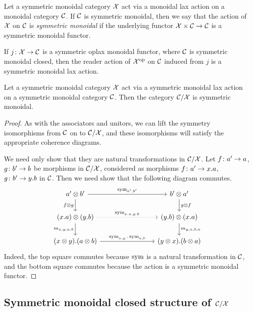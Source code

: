 \documentclass{article}
\begin{document}
\begin{definition}
  Let a symmetric monoidal category $\mathcal X$ act via a monoidal lax action on a monoidal category ${\mathcal{C}}$.  
  If ${\mathcal{C}}$ is symmetric monoidal, then we say that the action of $\mathcal X$ on ${\mathcal{C}}$ is \emph{symmetric monoidal} if the underlying functor $\mathcal X \times {\mathcal{C}} \to {\mathcal{C}}$ is a symmetric monoidal functor.
\end{definition}

\begin{example}
  If $j\colon \mathcal X \to {\mathcal{C}}$ is a symmetric oplax monoidal functor, where ${\mathcal{C}}$ is symmetric monoidal closed, then the reader action of $\mathcal X^{\mathrm{op}}$ on ${\mathcal{C}}$ induced from $j$ is a symmetric monoidal lax action.
\end{example}

\begin{proposition}
  Let a symmetric monoidal category $\mathcal X$ act via a symmetric monoidal lax action on a symmetric monoidal category ${\mathcal{C}}$.  
  Then the category ${\mathcal{C}}/\mathcal X$ is symmetric monoidal.
\end{proposition}
\begin{proof}
  As with the associators and unitors, we can lift the symmetry isomorphisms from ${\mathcal{C}}$ on to ${\mathcal{C}}/\mathcal X$, and these isomorphisms will satisfy the appropriate coherence diagrams.

  We need only show that they are natural transformations in ${\mathcal{C}}/\mathcal X$.  
  Let $f\colon a' \to a$, $g\colon b' \to b$ be morphisms in ${\mathcal{C}}/\mathcal X$, considered as morphisms $f\colon a' \to x.a$, $g\colon b' \to y.b$ in ${\mathcal{C}}$.  
  Then we need show that the following diagram commutes.
  \[
    \begin{tikzcd}[column sep=80pt]
      a'\tensor b' \arrow[r, "{\sym_{a',b'}}"] \arrow[d, "f\tensor g"']
        & b' \tensor a' \arrow[d, "g\tensor f"] \\
      (x.a)\tensor(y.b) \arrow[r, "{\sym_{x.a,y.b}}", dotted] \arrow[d, "{m_{x,y,a,b}}"']
        & (y.b) \tensor (x.a) \arrow[d, "{m_{y,x,b,a}}"] \\
      (x\tensor y).(a\tensor b) \arrow[r, "{\sym_{x,y}.\sym_{a,b}}"]
        & (y \tensor x).(b\tensor a)
    \end{tikzcd}
    \]
  Indeed, the top square commutes because $\operatorname{sym}$ is a natural transformation in ${\mathcal{C}}$, and the bottom square commutes because the action is a symmetric monoidal functor.
\end{proof}

\subsection{Symmetric monoidal closed structure of ${\mathcal{C}}/\mathcal X$}
\end{document}
